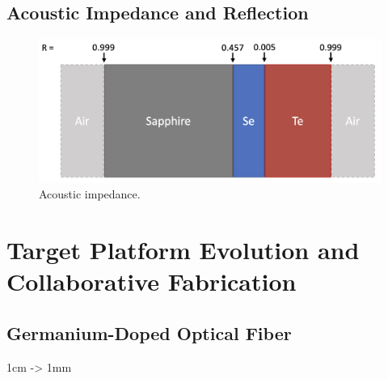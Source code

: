 \subsection{Acoustic Impedance and Reflection}
\label{subsec:Raman:AcousticImpedanceAndReflection}

\begin{figure}[t]
  \centering
  \includegraphics[width=\textwidth]{figs/4-Raman/AcousticImpedance.png}
  \caption{Acoustic impedance.}
  \label{fig:Raman:AcousticImpedance}
\end{figure}


\section{Target Platform Evolution and Collaborative Fabrication}
\label{sec:Raman:TargetPlatforms}

\subsection{Germanium-Doped Optical Fiber}
\label{subsec:Raman:Target:UHNA3}

1cm -> 1mm

